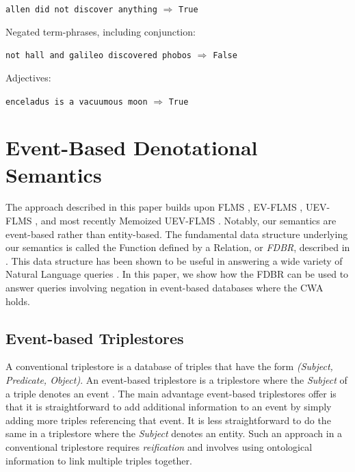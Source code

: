 \documentclass[../main.tex]{subfiles}
\begin{document}
\begin{refsection}
\texttt{allen did not discover anything} $\Rightarrow$ \texttt{True}

\examplespacing

\noindent Negated term-phrases, including conjunction:

\examplespacing

\texttt{not hall and galileo discovered phobos} $\Rightarrow$ \texttt{False}

\examplespacing

\noindent Adjectives:

\examplespacing

\texttt{enceladus is a vacuumous moon} $\Rightarrow$ \texttt{True}

\examplespacing




\section{Event-Based Denotational Semantics}
\label{sec:event}

\noindent The approach described in this paper builds upon FLMS \cite{frost1989constructing}, EV-FLMS \cite{frost2014demonstration}, UEV-FLMS \cite{peelar2016accommodating}, and most recently
Memoized UEV-FLMS \cite{frostpeelar2019}.  Notably, our semantics are event-based rather than entity-based.  The fundamental data structure underlying our semantics is called the Function defined by a Relation, or \textit{FDBR}, described in .  This data structure has been shown to be useful in answering a wide variety of Natural Language queries \cite{frostpeelar2019}.  In this paper, we show how the FDBR can be used to answer queries involving negation in event-based databases where the CWA holds.

\subsection{Event-based Triplestores}

A conventional triplestore is a database of triples that have the form \textit{(Subject, Predicate, Object)}.
An event-based triplestore is a triplestore where the \textit{Subject} of a triple denotes an event \cite{frost2013event}\cite{frost2014demonstration}.
The main advantage event-based triplestores offer is that it is straightforward to add additional
information to an event by simply adding more triples referencing that event.  It is less straightforward to do the same in a triplestore where the \textit{Subject} denotes an entity.
Such an approach in a conventional triplestore requires \textit{reification} and involves using ontological information to link multiple triples together.


\end{refsection}
\end{document}
